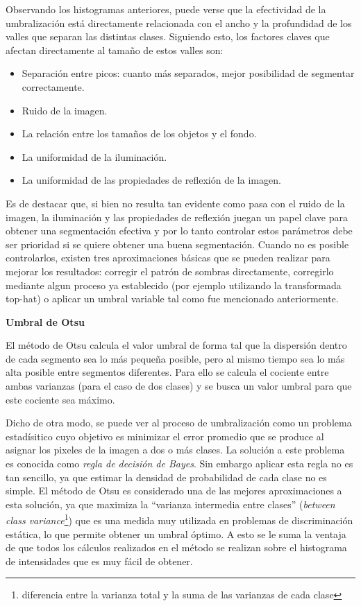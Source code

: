 Observando los histogramas anteriores, puede verse que la efectividad de la umbralización está directamente relacionada con el ancho y la profundidad de los valles que separan las distintas clases. Siguiendo esto, los factores claves que afectan directamente al tamaño de estos valles son:
\begin{itemize}
\item Separación entre picos: cuanto más separados, mejor posibilidad de segmentar correctamente.
\item Ruido de la imagen.
\item La relación entre los tamaños de los objetos y el fondo.
\item La uniformidad de la iluminación.
\item La uniformidad de las propiedades de reflexión de la imagen.
\end{itemize}

Es de destacar que, si bien no resulta tan evidente como pasa con el ruido de la imagen, la iluminación y las propiedades de reflexión juegan un papel clave para obtener una segmentación efectiva y por lo tanto controlar estos parámetros debe ser prioridad si se quiere obtener una buena segmentación. Cuando no es posible controlarlos, existen tres aproximaciones básicas que se pueden realizar para mejorar los resultados: corregir el patrón de sombras directamente, corregirlo mediante algun proceso ya establecido (por ejemplo utilizando la transformada top-hat\cite{tophat}) o aplicar un umbral variable tal como fue mencionado anteriormente.

\vspace{10 mm}
\textbf{Umbral de Otsu}

El método de Otsu\cite{otsu} calcula el valor umbral de forma tal que la dispersión dentro de cada segmento sea lo más pequeña posible, pero al mismo tiempo sea lo más alta posible entre segmentos diferentes. Para ello se calcula el cociente entre ambas varianzas (para el caso de dos clases) y se busca un valor umbral para que este cociente sea máximo.

Dicho de otra modo, se puede ver al proceso de umbralización como un problema estadísitico cuyo objetivo es minimizar el error promedio que se produce al asignar los pixeles de la imagen a dos o más clases. La solución a este problema es conocida como \textit{regla de decisión de Bayes\cite{bayes}}. Sin embargo aplicar esta regla no es tan sencillo, ya que estimar la densidad de probabilidad de cada clase no es simple. El método de Otsu\cite{otsu} es considerado una de las mejores aproximaciones a esta solución, ya que maximiza la ``varianza intermedia entre clases'' (\textit{between class variance}\footnote{diferencia entre la varianza total y la suma de las varianzas de cada clase\cite{betweenvarianze}}) que es una medida muy utilizada en problemas de discriminación estática, lo que permite obtener un umbral óptimo. A esto se le suma la ventaja de que todos los cálculos realizados en el método se realizan sobre el histograma de intensidades que es muy fácil de obtener.


